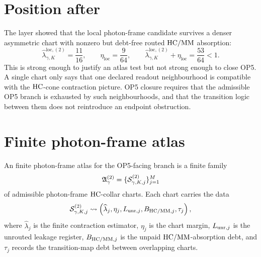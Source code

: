 \begin{abstract}
This delta layer upgrades the local proof chain photon-frame \(\HC\)-collar contraction probes from single-chart diagnostics to a finite-atlas closure-candidate test. The layer also states, explicitly and conservatively, what would still have to be proved in order to close OP5 under the hypothesis that OP5 is the \(\HC\)-cone/reflector surface of the source-return route rather than an independent endpoint obstruction. The result is an atlas-level closure candidate, not a final OP5 theorem.
\end{abstract}

\section{Position after}

The layer showed that the local photon-frame candidate survives a denser asymmetric chart with nonzero but debt-free routed \(\mathrm{HC}/\mathrm{MM}\) absorption:
\[
\widehat\lambda_{\gamma,K}^{\mathrm{loc},(2)}=\frac{11}{16},
\qquad
\eta_{\mathrm{loc}}=\frac{9}{64},
\qquad
\widehat\lambda_{\gamma,K}^{\mathrm{loc},(2)}+\eta_{\mathrm{loc}}=\frac{53}{64}<1.
\]
This is strong enough to justify an atlas test but not strong enough to close OP5. A single chart only says that one declared readout neighbourhood is compatible with the \(\HC\)-cone contraction picture. OP5 closure requires that the admissible OP5 branch is exhausted by such neighbourhoods, and that the transition logic between them does not reintroduce an endpoint obstruction.

\section{Finite photon-frame atlas}

\begin{definition}
An finite photon-frame atlas for the OP5-facing branch is a finite family
\[
\mathfrak A_{\gamma}^{(2)}=
\{\mathcal S_{\gamma,K,j}^{(2)}\}_{j=1}^{M}
\]
of admissible photon-frame \(\HC\)-collar charts. Each chart carries the data
\[
\mathcal S_{\gamma,K,j}^{(2)}
\leadsto
\left(
\widehat\lambda_j,
\eta_j,
L_{\mathrm{unr},j},
B_{\mathrm{HC}/\mathrm{MM},j},
\tau_j
\right),
\]
where \(\widehat\lambda_j\) is the finite contraction estimator, \(\eta_j\) is the chart margin, \(L_{\mathrm{unr},j}\) is the unrouted leakage register, \(B_{\mathrm{HC}/\mathrm{MM},j}\) is the unpaid \(\mathrm{HC}/\mathrm{MM}\)-absorption debt, and \(\tau_j\) records the transition-map debt between overlapping charts.
\end{definition}

